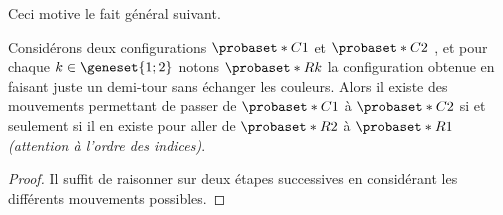 Ceci motive le fait général suivant.


\begin{fact} \label{symmetry-no-color}
	Considérons deux configurations $\probaset*{C}{1}$ et $\probaset*{C}{2}$ , et pour chaque $k \in \geneset{1 ; 2}$ notons $\probaset*{R}{k}$ la configuration obtenue en faisant juste un demi-tour sans échanger les couleurs.
	Alors il existe des mouvements permettant de passer de $\probaset*{C}{1}$ à $\probaset*{C}{2}$ si et seulement si il en existe pour aller de $\probaset*{R}{2}$ à $\probaset*{R}{1}$ \emph{(attention à l'ordre des indices)}.
\end{fact}


\begin{proof}
	Il suffit de raisonner sur deux étapes successives en considérant les différents mouvements possibles.
\end{proof}
